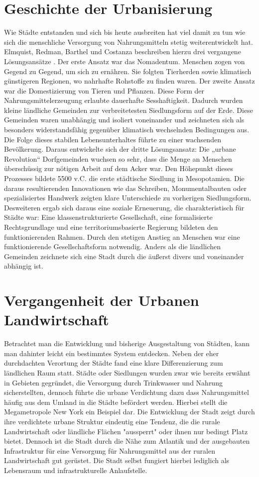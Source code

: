 \documentclass{article}
\begin{document}
\section{Geschichte der Urbanisierung}
Wie Städte entstanden und sich bis heute ausbreiten hat viel damit zu tun wie sich die menschliche Versorgung von Nahrungsmitteln stetig weiterentwickelt hat. Elmquist, Redman, Barthel und Costanza beschreiben hierzu drei vergangene Lösungsansätze \cite{Elmqvist2013}. Der erste Ansatz war das Nomadentum. Menschen zogen von Gegend zu Gegend, um sich zu ernähren. Sie folgten Tierherden sowie klimatisch günstigeren Regionen, wo nahrhafte Rohstoffe zu finden waren. Der zweite Ansatz war die Domestizierung von Tieren und Pflanzen. Diese Form der Nahrungsmittelerzeugung erlaubte dauerhafte Sesshaftigkeit. Dadurch wurden kleine ländliche Gemeinden zur verbreitetesten Siedlungsform auf der Erde. Diese Gemeinden waren unabhängig und isoliert voneinander und zeichneten sich als besonders widerstandsfähig gegenüber klimatisch wechselnden Bedingungen aus. Die Folge dieses stabilen Lebensunterhaltes führte zu einer wachsenden Bevölkerung. Daraus entwickelte sich der dritte Lösungsansatz: Die „urbane Revolution“ %
Dorfgemeinden wuchsen so sehr, dass die Menge an Menschen überschüssig zur nötigen Arbeit auf dem Acker war. Den Höhepunkt dieses Prozesses bildete 5500 v.C. die erste städtische Siedlung in Mesopotamien. Die daraus resultierenden Innovationen wie das Schreiben, Monumentalbauten oder spezialisiertes Handwerk zeigten klare Unterschiede zu vorherigen Siedlungsform. Desweiteren ergab sich daraus eine soziale Erneuerung, die charakteristisch für Städte war: Eine klassenstrukturierte Gesellschaft, eine formalisierte Rechtsgrundlage und eine territoriumsbasierte Regierung bildeten den funktionierenden Rahmen. Durch den stetigen Anstieg an Menschen war eine funktionierende Gesellschaftsform notwendig. Anders als die ländlichen Gemeinden zeichnete sich eine Stadt durch die äußerst divers und voneinander abhängig ist. 

\section{Vergangenheit der Urbanen Landwirtschaft}

Betrachtet man die Entwicklung und bisherige Ausgestaltung von Städten, kann man dahinter leicht ein bestimmtes System entdecken. Neben der eher durchdachten Verortung der Städte fand eine klare Differenzierung zum ländlichen Raum statt. Städte oder Siedlungen wurden
zwar wie bereits erwähnt in Gebieten gegründet, die Versorgung durch Trinkwasser und Nahrung sicherstellten, dennoch führte die urbane Verdichtung dazu dass Nahrungsmittel häufig aus dem Umland in die Städte befördert werden. Hierbei stellt die Megametropole New York ein Beispiel dar. Die Entwicklung der Stadt zeigt durch ihre verdichtete urbane Struktur eindeutig eine Tendenz, die die rurale Landwirtschaft oder ländliche Flächen "aussperrt" oder ihnen nur bedingt Platz bietet. Dennoch ist die Stadt durch die Nähe zum Atlantik und der ausgebauten Infrastruktur für eine Versorgung für Nahrungsmittel aus der ruralen Landwirtschaft gut gerüstet. Die Stadt selbst fungiert hierbei lediglich als Lebensraum und infrastrukturelle Anlaufstelle.
\end{document}
